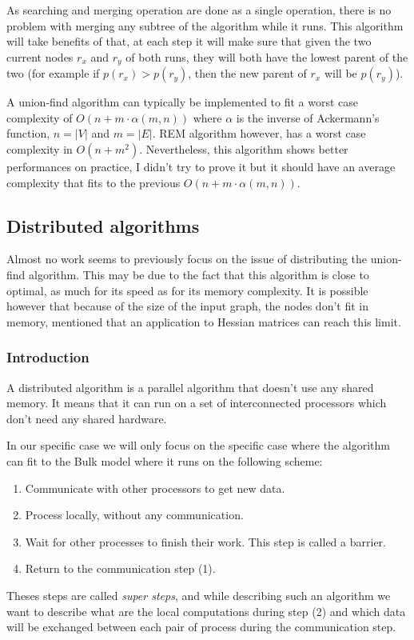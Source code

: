 \documentclass[12px]{article}
\begin{document}
      As searching and merging operation are done as a single operation, there is no problem with merging any subtree of the algorithm while it runs. This algorithm will take benefits of that, at each step it will make sure that given the two current nodes $r_x$ and $r_y$ of both runs, they will both have the lowest parent of the two (for example if $p(r_x) > p(r_y)$, then the new parent of $r_x$ will be $p(r_y)$).

      A union-find algorithm can typically be implemented to fit a worst case complexity of $O(n + m \cdot \alpha(m, n))$ where $\alpha$ is the inverse of Ackermann's function, $n = |V|$ and $m = |E|$. REM algorithm however, has a worst case complexity in $O(n + m^2)$. 
      Nevertheless, this algorithm shows better performances on practice, I didn't try to prove it but it should have an average complexity that fits to the previous $O(n + m \cdot \alpha(m, n))$.

    \subsection{Distributed algorithms}
      Almost no work seems to previously focus on the issue of distributing the union-find algorithm.
      This may be due to the fact that this algorithm is close to optimal, as much for its speed as for its memory complexity.
      It is possible however that because of the size of the input graph, the nodes don't fit in memory,  mentioned that an application to Hessian matrices can reach this limit.

      \subsubsection{Introduction}
        A distributed algorithm is a parallel algorithm that doesn't use any shared memory.
        It means that it can run on a set of interconnected processors which don't need any shared hardware.

        In our specific case we will only focus on the specific case where the algorithm can fit to the Bulk model where it runs on the following scheme:
          \begin{enumerate}
            \item Communicate with other processors to get new data.
            \item Process locally, without any communication.
            \item Wait for other processes to finish their work. This step is called a barrier.
            \item Return to the communication step (1).
          \end{enumerate}
        Theses steps are called \emph{super steps}, and while describing such an algorithm we want to describe what are the local computations during step (2) and which data will be exchanged between each pair of process during the communication step.
\end{document}
